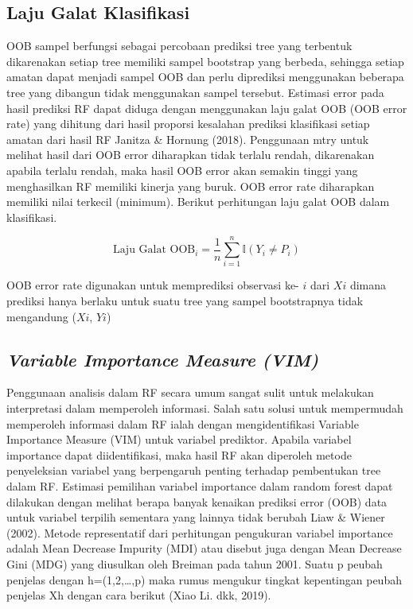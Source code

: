 \subsection{Laju Galat Klasifikasi}
OOB sampel berfungsi sebagai percobaan prediksi tree yang terbentuk dikarenakan setiap tree memiliki sampel bootstrap yang berbeda, sehingga setiap amatan dapat menjadi sampel OOB dan perlu diprediksi menggunakan beberapa tree yang dibangun tidak menggunakan sampel tersebut. Estimasi error pada hasil prediksi RF dapat diduga dengan menggunakan laju galat OOB (OOB error rate) yang dihitung dari hasil proporsi kesalahan prediksi klasifikasi setiap amatan dari hasil RF Janitza \& Hornung (2018). Penggunaan mtry untuk melihat hasil dari OOB error diharapkan tidak terlalu rendah, dikarenakan apabila terlalu rendah, maka hasil OOB error akan semakin tinggi yang menghasilkan RF memiliki kinerja yang buruk. OOB error rate diharapkan memiliki nilai terkecil (minimum). Berikut perhitungan laju galat OOB dalam klasifikasi.

\begin{equation}
    \text{Laju Galat } \text{OOB}_i = \frac{1}{n} \sum_{i=1}^{n} \mathbb{I}(Y_i \neq P_i)
    \end{equation}

OOB error rate digunakan untuk memprediksi observasi ke- $i$ dari $Xi$ dimana
prediksi hanya berlaku untuk suatu tree yang sampel bootstrapnya tidak mengandung ($Xi$, $Yi$)
    
\subsection{\textit{Variable Importance Measure (VIM)}}
Penggunaan analisis dalam RF secara umum sangat sulit untuk melakukan interpretasi dalam memperoleh informasi. Salah satu solusi untuk mempermudah memperoleh informasi dalam RF ialah dengan mengidentifikasi Variable Importance Measure (VIM) untuk variabel prediktor. Apabila variabel importance dapat diidentifikasi, maka hasil RF akan diperoleh metode penyeleksian variabel yang berpengaruh penting terhadap pembentukan tree dalam RF. Estimasi pemilihan variabel importance dalam random forest dapat dilakukan dengan melihat berapa banyak kenaikan prediksi error (OOB) data untuk variabel terpilih sementara yang lainnya tidak berubah Liaw \& Wiener (2002).
Metode representatif dari perhitungan pengukuran variabel importance adalah Mean Decrease Impurity (MDI) atau disebut juga dengan Mean Decrease Gini (MDG) yang diusulkan oleh Breiman pada tahun 2001. Suatu p peubah penjelas dengan h=(1,2,…,p) maka rumus mengukur tingkat kepentingan peubah penjelas Xh dengan cara berikut (Xiao Li. dkk, 2019).